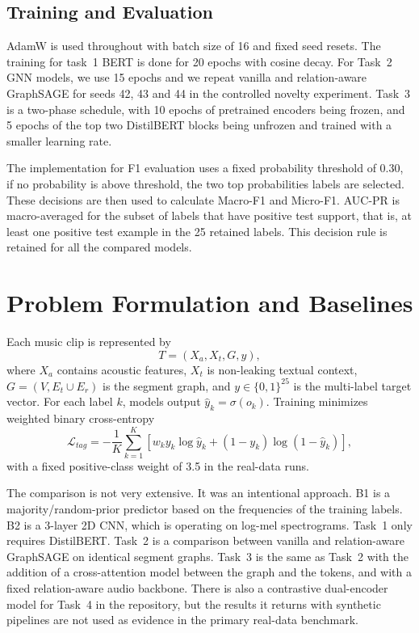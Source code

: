 \documentclass[conference]{IEEEtran}
\begin{document}
\subsection{Training and Evaluation}
AdamW is used throughout with batch size of 16 and fixed seed resets. The training for task~1 BERT is done for 20 epochs with cosine decay. For Task~2 GNN models, we use 15 epochs and we repeat vanilla and relation-aware GraphSAGE for seeds 42, 43 and 44 in the controlled novelty experiment. Task~3 is a two-phase schedule, with 10 epochs of pretrained encoders being frozen, and 5 epochs of the top two DistilBERT blocks being unfrozen and trained with a smaller learning rate.

The implementation for F1 evaluation uses a fixed probability threshold of 0.30, if no probability is above threshold, the two top probabilities labels are selected. These decisions are then used to calculate Macro-F1 and Micro-F1. AUC-PR is macro-averaged for the subset of labels that have positive test support, that is, at least one positive test example in the 25 retained labels. This decision rule is retained for all the compared models.

\section{Problem Formulation and Baselines}
Each music clip is represented by
\begin{equation}
T=(X_a,X_t,G,y),
\end{equation}
where $X_a$ contains acoustic features, $X_t$ is non-leaking textual context, $G=(V,E_t\cup E_r)$ is the segment graph, and $y\in\{0,1\}^{25}$ is the multi-label target vector. For each label $k$, models output $\hat y_k=\sigma(o_k)$. Training minimizes weighted binary cross-entropy
\begin{equation}
\mathcal{L}_{tag}=-\frac{1}{K}\sum_{k=1}^{K}\left[w_k y_k\log \hat y_k+(1-y_k)\log(1-\hat y_k)\right],
\end{equation}
with a fixed positive-class weight of 3.5 in the real-data runs.

The comparison is not very extensive. It was an intentional approach. B1 is a majority/random-prior predictor based on the frequencies of the training labels. B2 is a 3-layer 2D CNN, which is operating on log-mel spectrograms. Task~1 only requires DistilBERT. Task~2 is a comparison between vanilla and relation-aware GraphSAGE on identical segment graphs. Task~3 is the same as Task~2 with the addition of a cross-attention model between the graph and the tokens, and with a fixed relation-aware audio backbone. There is also a contrastive dual-encoder model for Task~4 in the repository, but the results it returns with synthetic pipelines are not used as evidence in the primary real-data benchmark.
\end{document}
